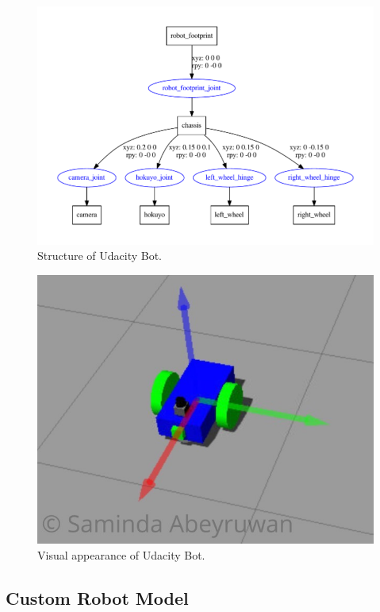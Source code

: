 \documentclass[10pt,journal,compsoc]{IEEEtran}
\begin{document}
\begin{figure}[thpb]
      \centering
      \includegraphics[width=\linewidth]{misc/udacity_bot.pdf}
      \caption{Structure of Udacity Bot.}
      \label{fig:udacity_bot}
\end{figure}

\begin{figure}[thpb]
      \centering
      \includegraphics[width=\linewidth]{misc/ub_w.jpeg}
      \caption{Visual appearance of Udacity Bot.}
      \label{fig:ub}
\end{figure}

\subsection{Custom Robot Model}
\end{document}
